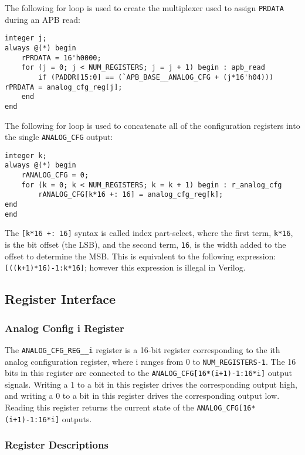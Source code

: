 The following for loop is used to create the multiplexer used to assign \texttt{PRDATA} during an APB read:

\begin{lstlisting}
integer j;
always @(*) begin
    rPRDATA = 16'h0000;
    for (j = 0; j < NUM_REGISTERS; j = j + 1) begin : apb_read
        if (PADDR[15:0] == (`APB_BASE__ANALOG_CFG + (j*16'h04))) rPRDATA = analog_cfg_reg[j];
    end
end
\end{lstlisting}

The following for loop is used to concatenate all of the configuration registers into the single \texttt{ANALOG\_CFG} output:

\begin{lstlisting}
integer k;
always @(*) begin
    rANALOG_CFG = 0;
    for (k = 0; k < NUM_REGISTERS; k = k + 1) begin : r_analog_cfg
        rANALOG_CFG[k*16 +: 16] = analog_cfg_reg[k];
end
end
\end{lstlisting}

The \texttt{[k*16 +: 16]} syntax is called index part-select, where the first term, \texttt{k*16}, is the bit offset (the LSB), and the second term, \texttt{16}, is the width added to the offset to determine the MSB. This is equivalent to the following expression: \texttt{[((k+1)*16)-1:k*16]}; however this expression is illegal in Verilog.

\subsection{Register Interface} \label{analog-cfg-registers}
\subsubsection{Analog Config i Register}
The \texttt{ANALOG\_CFG\_REG\_\_i} register is a 16-bit register corresponding to the ith analog configuration register, where i ranges from 0 to \texttt{NUM\_REGISTERS-1}. The 16 bits in this register are connected to the \texttt{ANALOG\_CFG[16*(i+1)-1:16*i]} output signals. Writing a 1 to a bit in this register drives the corresponding output high, and writing a 0 to a bit in this register drives the corresponding output low. Reading this register returns the current state of the \texttt{ANALOG\_CFG[16*(i+1)-1:16*i]} outputs.

\subsubsection{Register Descriptions}

